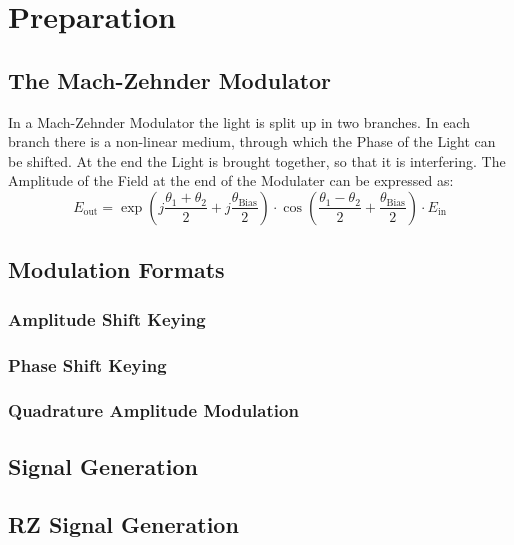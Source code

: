\chapter{Preparation}
\section{The Mach-Zehnder Modulator}
\begin{figure}
\caption{}
\end{figure}
In a Mach-Zehnder Modulator the light is split up in two branches. In each branch there is a non-linear medium, through which the Phase of the Light can be shifted. At the end the Light is brought together, so that it is interfering. The Amplitude of the Field at the end of the Modulater can be expressed as:
\begin{equation}
 E_{\mathrm{out}}=\exp\left(j\frac{\theta_1+\theta_2}{2}+j\frac{\theta_{\mathrm{Bias}}}{2} \right)\cdot\cos\left(\frac{\theta_1-\theta_2}{2}+\frac{\theta_{\mathrm{Bias}}}{2}\right)\cdot E_{\mathrm{in}}
\end{equation}


\section{Modulation Formats}
\subsection{Amplitude Shift Keying}
 
\subsection{Phase Shift Keying}

\subsection{Quadrature Amplitude Modulation}


\section{Signal Generation}

\section{RZ Signal Generation}